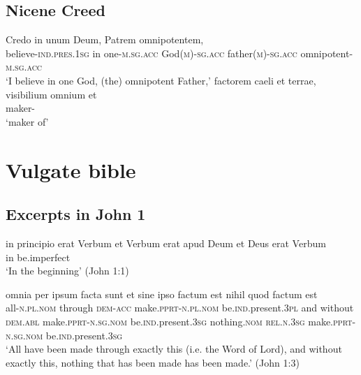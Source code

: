 \documentclass[a4paper, oneside, 12pt]{report}
\newcommand*{\category}[1]{\textsc{#1}}
\newcommand{\translate}[1]{`#1'}
\begin{document}
\subsection{Nicene Creed}

\begin{exe}
    \ex \gll Credo in unum Deum, Patrem omnipotentem, \\
    believe-\category{ind}.\category{pres}.\category{1sg} in 
    one-\category{m}.\category{sg}.\category{acc} 
    God(\category{m})-\category{sg}.\category{acc} 
    father(\category{m})-\category{sg}.\category{acc}
    omnipotent-\category{m}.\category{sg}.\category{acc} \\
    \glt \translate{I believe in one God, (the) omnipotent Father,} 
    \ex \gll factorem caeli et terrae, visibilium omnium et \\ 
    maker- \\
    \glt \translate{maker of}
\end{exe}

\section{Vulgate bible}

\subsection{Excerpts in John 1}\label{sec:text.vulgate.john}

\begin{exe}
    \ex\label{ex:text.john.1.1} 
    \gll in principio erat Verbum et Verbum erat apud Deum et Deus erat Verbum \\
    in {} be.\acs{imperfect}  \\
    \glt \translate{In the beginning} (John 1:1)
    
    \ex\label{ex:text.john.1.3}
    \gll omnia per ipsum facta sunt 
    et sine ipso factum est nihil quod factum est \\
    all-\category{n}.\category{pl}.\category{nom} through \category{dem}-\category{acc}
    make.\category{pprt}-\category{n}.\category{pl}.\category{nom} 
    be.\category{ind}.\acs{present}.\category{3pl} 
    and without \category{dem}.\category{abl} 
    make.\category{pprt}-\category{n}.\category{sg}.\category{nom} 
    be.\category{ind}.\acs{present}.\category{3sg}
    nothing.\category{nom}
    \category{rel}.\category{n}.\category{3sg}
    make.\category{pprt}-\category{n}.\category{sg}.\category{nom} 
    be.\category{ind}.\acs{present}.\category{3sg} \\
    \glt \translate{All have been made through exactly this (i.e. the Word of Lord),
    and without exactly this, nothing that has been made has been made.} (John 1:3)
\end{exe}
\end{document}
